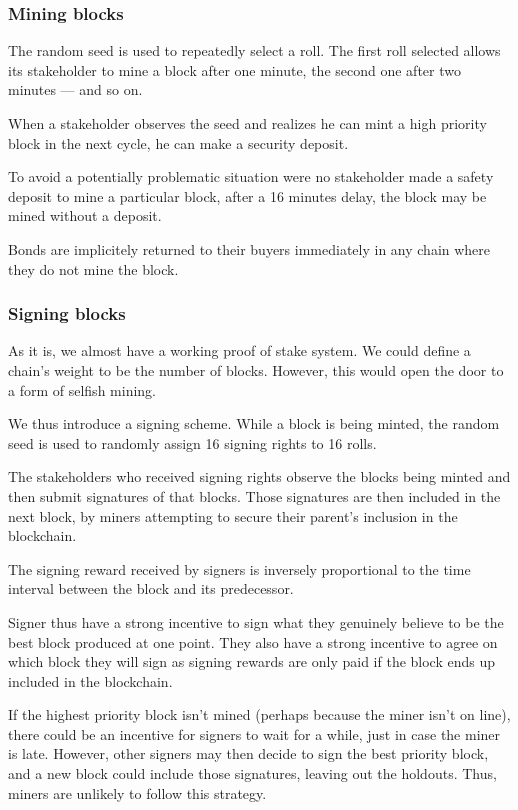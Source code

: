 \documentclass[letterpaper]{article}
\begin{document}
\subsubsection{Mining blocks}
The random seed is used to repeatedly select a roll. The first roll selected
allows its stakeholder to mine a block after one minute, the second one after
two minutes --- and so on. 

When a stakeholder observes the seed and realizes he can mint a high priority
block in the next cycle, he can make a security deposit.

To avoid a potentially problematic situation were no stakeholder made a 
safety deposit to mine a particular block, after a 16 minutes delay, the
block may be mined without a deposit.

Bonds are implicitely returned to their buyers immediately in any chain
where they do not mine the block.

\subsubsection{Signing blocks}
As it is, we almost have a working proof of stake system.
We could define a chain's weight to be the number of blocks.
However, this would open the door to a form of selfish mining.

We thus introduce a signing scheme. While a block is being minted, the random
seed is used to randomly assign 16 signing rights to 16 rolls. 

The stakeholders who received signing rights observe the blocks being minted and
then submit signatures of that blocks. Those signatures are then included in
the next block, by miners attempting to secure their parent's inclusion in the
blockchain.

The signing reward received by signers is inversely proportional to the time
interval between the block and its predecessor.

Signer thus have a strong incentive to sign what they genuinely believe to be
the best block produced at one point. They also have a strong incentive to agree
on which block they will sign as signing rewards are only paid if the block ends
up included in the blockchain.

If the highest priority block isn't mined (perhaps because the miner isn't
on line), there could be an incentive for signers to wait for a while, just
in case the miner is late. However, other signers may then decide to sign the
best priority block, and a new block could include those signatures, leaving out
the holdouts. Thus, miners are unlikely to follow this strategy.
\end{document}

